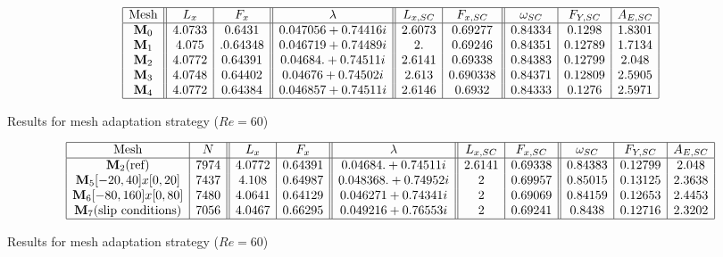 \documentclass[twocolumn,10pt]{asme2ej}
\begin{document}
\begin{table}
$$
\begin{array}{|c||c|c||c||c|c||c|c|c|}
\hline
\mbox{Mesh} & L_x & F_x & \lambda & L_{x,SC} & F_{x,SC} & \omega_{SC}  & F_{Y,SC} & A_{E,SC} \\
\hline
\mathbf{M}_0 & 4.0733 & 0.6431 	& 0.047056 + 0.74416i 		& 2.6073  &0.69277 		&  0.84334 & 0.1298 & 1.8301  \\
\mathbf{M}_1 & 4.075 &.  0.64348  	& 0.046719 + 0.74489i 		& 2.          & 0.69246 	& 0.84351 & 0.12789 & 1.7134 \\  
\mathbf{M}_2 & 4.0772 & 0.64391 	& 0.04684. +  0.74511i 		& 2.6141  & 0.69338 	& 0.84383 & 0.12799 & 2.048   \\ 
\mathbf{M}_3 & 4.0748 & 0.64402 	& 0.04676  + 0.74502i 		& 2.613 	& 0.690338 	& 0.84371 & 0.12809 & 2.5905 \\
\mathbf{M}_4 & 4.0772 & 0.64384	& 0.046857+0.74511i 		& 2.6146 	& 0.6932		& 0.84333 & 0.1276	 & 2.5971 \\
\hline
\end{array}
$$
\caption{Results for mesh adaptation strategy ($Re = 60$)}
\end{table}





\begin{table}
$$
\begin{array}{|c|c||c|c||c||c|c||c|c|c|}
\hline
\mbox{Mesh} & N & L_x & F_x & \lambda & L_{x,SC} & F_{x,SC} & \omega_{SC}  & F_{Y,SC} & A_{E,SC} \\
\hline
\mathbf{M}_2 \mbox{(ref)} 	& 7974  	& 4.0772 & 0.64391 	& 0.04684. +  0.74511i 	& 2.6141  & 0.69338 	& 0.84383 & 0.12799 & 2.048   \\ 


\mathbf{M}_5 [-20,40]x[0,20] 	& 7437	&  4.108 & 0.64987 	& 0.048368. +  0.74952i 	& 2  & 0.69957 	& 0.85015 & 0.13125 & 2.3638   \\ 
\mathbf{M}_6 [-80,160]x[0,80] 	& 7480	& 4.0641 & 0.64129		& 0.046271 + 0.74341i 	& 2 	& 0.69069 	& 0.84159 & 0.12653 & 2.4453 \\
\mathbf{M}_7 \mbox{(slip conditions)}	 & 7056	& 4.0467 &0.66295		& 0.049216+0.76553i 	& 2 	& 0.69241		& 0.8438  & 0.12716	 & 2.3202 \\
\hline
\end{array}
$$
\caption{Results for mesh adaptation strategy ($Re = 60$)}
\end{table}
\end{document}
